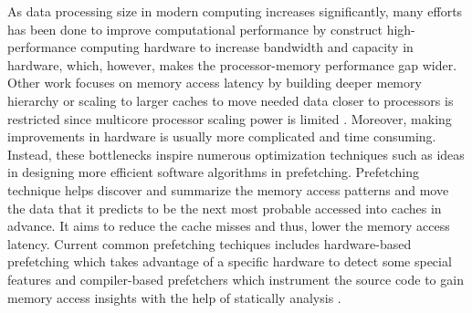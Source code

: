 



As data processing size 
in modern computing increases significantly, many efforts has been done to improve computational performance by construct high-performance computing hardware to increase bandwidth and capacity in hardware, which, however, makes the processor-memory performance gap wider.
Other work focuses on memory access latency 
by building deeper memory hierarchy or scaling to larger caches to move needed data closer to processors is restricted since multicore processor scaling power is limited \cite{dark-silicon}.
Moreover, making improvements in hardware is usually more complicated and time consuming.
Instead, these bottlenecks inspire numerous optimization techniques such as ideas in designing more efficient software algorithms in prefetching. Prefetching technique helps discover and summarize the memory access patterns and move the data that it predicts to be the next most probable accessed into caches in advance.
It aims to reduce the cache misses and thus, lower the memory access latency.
Current common prefetching techiques includes hardware-based prefetching which takes advantage of a specific hardware to detect some special features \cite{linearlize-irregular-memory} and compiler-based prefetchers which instrument the source code to gain memory access insights with the help of statically analysis \cite{Compiler_Orchestrated}. 

